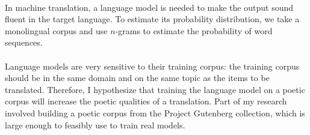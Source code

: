 \paragraph{}{In machine translation, a language model is needed to
  make the output sound fluent in the target language. To estimate its
  probability distribution, we take a monolingual corpus and use
  $n$-grams to estimate the probability of word sequences.}
\paragraph{}{Language models are very sensitive to their training
  corpus: the training corpus should be in the same domain and on the
  same topic as the items to be translated. Therefore, I hypothesize
  that training the language model on a poetic corpus will increase
  the poetic qualities of a translation. Part of my research involved
  building a poetic corpus from the Project Gutenberg collection,
  which is large enough to feasibly use to train real models.}
